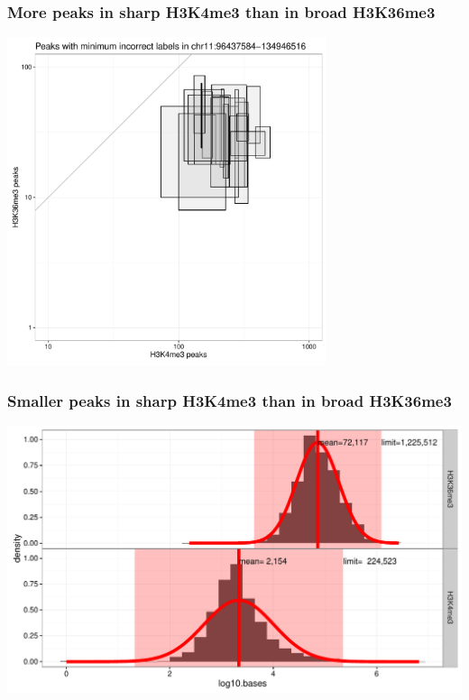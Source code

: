 \documentclass{beamer}
\begin{document}
\begin{frame}
  \frametitle{More peaks in sharp H3K4me3 than in broad H3K36me3}
  \includegraphics[width=0.7\textwidth]{figure-min-err-peaks-compare}
\end{frame}

\begin{frame}
  \frametitle{Smaller peaks in sharp H3K4me3 than in broad H3K36me3}
  \includegraphics[width=\textwidth]{figure-peak-size-model}
\end{frame}
\end{document}
